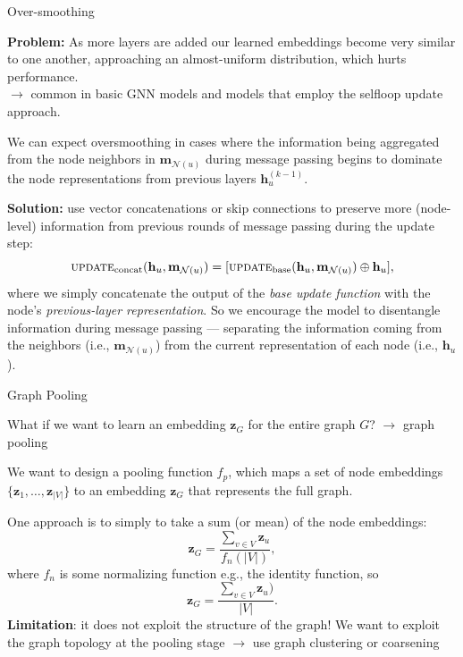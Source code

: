 \documentclass[10pt, aspectratio=169, compress, protectframetitle, handout]{beamer}
\begin{document}
\begin{frame}{Over-smoothing}

    \textbf{Problem:} As more layers are added our learned embeddings become very similar to one another, approaching an \alert{almost-uniform distribution}, which \alert{hurts performance}.\\
    $\longrightarrow$ common in basic GNN models and models that employ the selfloop update approach.
    
    We can expect oversmoothing in cases where the information being aggregated from the node neighbors in $\mathbf m_{\mathcal N(u)}$ during message passing begins to \alert{dominate} the node representations from previous layers $\mathbf h_u^{(k-1)}$.
    
    \textbf{Solution:} use vector concatenations or \alert{skip connections} to preserve more (node-level) information from previous rounds of message passing during the update step:
    \begin{equation}
    \textsc{update}_\text{concat}(\mathbf h_u, \mathbf m_{\mathcal N(u)}) = [\textsc{update}_\text{base}(\mathbf h_u, \mathbf m_{\mathcal N(u)}) \oplus \mathbf h_u],
    \end{equation}
    where we simply concatenate the output of the \emph{base update function} with the node's \emph{previous-layer representation}. So we encourage the model to disentangle information during message passing --- separating the information coming from the neighbors (i.e., $\mathbf m_{\mathcal N(u)}$) from the current representation of each node (i.e., $\mathbf h_u$).
    
\end{frame}


\begin{frame}{Graph Pooling}

    What if we want to learn an embedding $\mathbf z_G$ for the entire graph $G$? $\longrightarrow$ \alert{graph pooling}
    
    We want to design a pooling function $f_p$, which maps a set of node embeddings $\{\mathbf z_1, \ldots, \mathbf z_{|V|} \}$ to an embedding $\mathbf z_G$ that represents the full graph.
    
    One approach is to simply to take a sum (or mean) of the node embeddings:
    \begin{equation}
        \mathbf z_G = \frac{\sum_{v \in V} \mathbf z_u}{f_n(|V|)},
    \end{equation}
    where $f_n$ is some normalizing function e.g., the identity function, so
    \begin{equation}
        \mathbf z_G = \frac{\sum_{v \in V} \mathbf z_u)}{|V|}.
    \end{equation}
    \textbf{Limitation}: it does not exploit the structure of the graph! We want to exploit the graph topology at the pooling stage $\longrightarrow$ use \alert{graph clustering or coarsening}
    
\end{frame}
\end{document}
